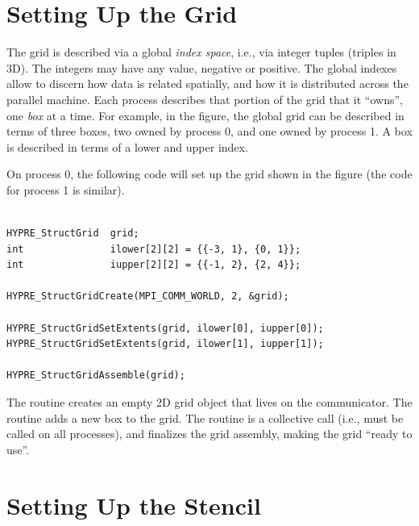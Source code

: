 
\section{Setting Up the Grid}
\label{Setting Up the Grid}

The grid is described via a global {\em index space}, i.e., via
integer tuples (triples in 3D).  The integers may have any value,
negative or positive.  The global indexes allow \hypre{} to discern
how data is related spatially, and how it is distributed across the
parallel machine.  Each process describes that portion of the grid
that it ``owns'', one {\em box} at a time.  For example, in the
figure, the global grid can be described in terms of three boxes, two
owned by process 0, and one owned by process 1.  A box is described in
terms of a lower and upper index.

On process 0, the following code will set up the grid shown in the
figure (the code for process 1 is similar).
\begin{display}
\begin{verbatim}

HYPRE_StructGrid  grid;
int               ilower[2][2] = {{-3, 1}, {0, 1}};
int               iupper[2][2] = {{-1, 2}, {2, 4}};

HYPRE_StructGridCreate(MPI_COMM_WORLD, 2, &grid);

HYPRE_StructGridSetExtents(grid, ilower[0], iupper[0]);
HYPRE_StructGridSetExtents(grid, ilower[1], iupper[1]);

HYPRE_StructGridAssemble(grid);

\end{verbatim}
\end{display}
The  routine creates an empty 2D grid
object that lives on the  communicator.  The
 routine adds a new box to the grid.
The  routine is a collective call
(i.e., must be called on all processes), and finalizes the grid
assembly, making the grid ``ready to use''.


\section{Setting Up the Stencil}
\label{Setting Up the Stencil}

